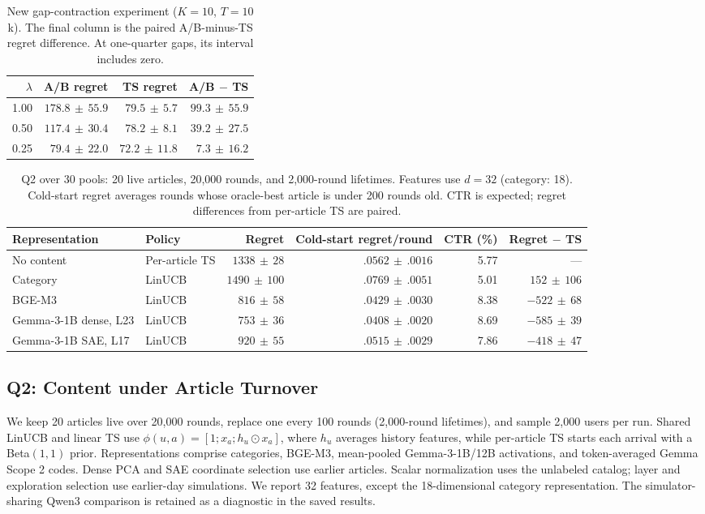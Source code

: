 \documentclass{article}
\newcommand{\ci}[2]{#1\,{\scriptstyle\pm}\,#2}
\begin{document}
\begin{table}[t]
\caption{New gap-contraction experiment ($K=10$, $T=10$k). The final column is the paired A/B-minus-TS regret difference. At one-quarter gaps, its interval includes zero.}
\label{tab:gaps}
\centering
\small
\setlength{\tabcolsep}{4pt}
\begin{tabular}{rrrr}
\toprule
$\lambda$ & A/B regret & TS regret & A/B $-$ TS \\
\midrule
1.00 & $\ci{178.8}{55.9}$ & $\ci{79.5}{5.7}$ & $\ci{99.3}{55.9}$ \\
0.50 & $\ci{117.4}{30.4}$ & $\ci{78.2}{8.1}$ & $\ci{39.2}{27.5}$ \\
0.25 & $\ci{79.4}{22.0}$ & $\ci{72.2}{11.8}$ & $\ci{7.3}{16.2}$ \\
\bottomrule
\end{tabular}
\end{table}

\begin{table}[t]
\caption{Q2 over 30 pools: 20 live articles, 20,000 rounds, and 2,000-round lifetimes. Features use $d=32$ (category: 18). Cold-start regret averages rounds whose oracle-best article is under 200 rounds old. CTR is expected; regret differences from per-article TS are paired.}
\label{tab:q2}
\centering
\small
\setlength{\tabcolsep}{5pt}
\begin{tabular}{llrrrr}
\toprule
Representation & Policy & Regret & Cold-start regret/round & CTR (\%) & Regret $-$ TS \\
\midrule
No content & Per-article TS & $\ci{1338}{28}$ & $\ci{.0562}{.0016}$ & 5.77 & --- \\
Category & LinUCB & $\ci{1490}{100}$ & $\ci{.0769}{.0051}$ & 5.01 & $\ci{152}{106}$ \\
BGE-M3 & LinUCB & $\ci{816}{58}$ & $\ci{.0429}{.0030}$ & 8.38 & $\ci{-522}{68}$ \\
Gemma-3-1B dense, L23 & LinUCB & $\ci{753}{36}$ & $\ci{.0408}{.0020}$ & 8.69 & $\ci{-585}{39}$ \\
Gemma-3-1B SAE, L17 & LinUCB & $\ci{920}{55}$ & $\ci{.0515}{.0029}$ & 7.86 & $\ci{-418}{47}$ \\
\bottomrule
\end{tabular}
\end{table}

\subsection{Q2: Content under Article Turnover}
We keep 20 articles live over 20,000 rounds, replace one every 100 rounds (2,000-round lifetimes), and sample 2,000 users per run. Shared LinUCB and linear TS use $\phi(u,a)=[1;x_a;h_u\odot x_a]$, where $h_u$ averages history features, while per-article TS starts each arrival with a Beta$(1,1)$ prior. Representations comprise categories, BGE-M3, mean-pooled Gemma-3-1B/12B activations, and token-averaged Gemma Scope 2 codes. Dense PCA and SAE coordinate selection use earlier articles. Scalar normalization uses the unlabeled catalog; layer and exploration selection use earlier-day simulations. We report 32 features, except the 18-dimensional category representation. The simulator-sharing Qwen3 comparison is retained as a diagnostic in the saved results.
\end{document}
